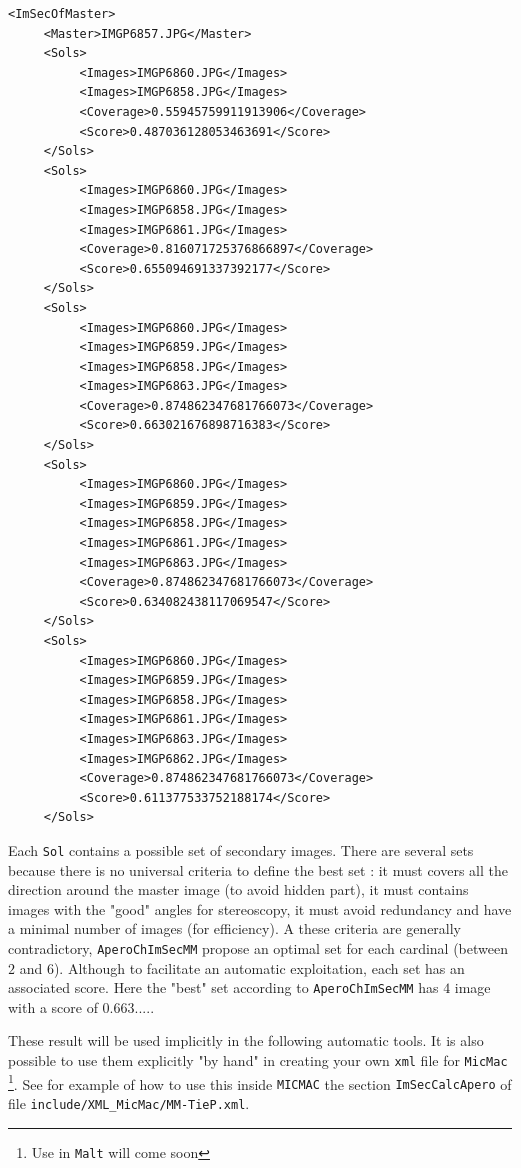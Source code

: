 {\small
\begin{verbatim}
<ImSecOfMaster>
     <Master>IMGP6857.JPG</Master>
     <Sols>
          <Images>IMGP6860.JPG</Images>
          <Images>IMGP6858.JPG</Images>
          <Coverage>0.55945759911913906</Coverage>
          <Score>0.487036128053463691</Score>
     </Sols>
     <Sols>
          <Images>IMGP6860.JPG</Images>
          <Images>IMGP6858.JPG</Images>
          <Images>IMGP6861.JPG</Images>
          <Coverage>0.816071725376866897</Coverage>
          <Score>0.655094691337392177</Score>
     </Sols>
     <Sols>
          <Images>IMGP6860.JPG</Images>
          <Images>IMGP6859.JPG</Images>
          <Images>IMGP6858.JPG</Images>
          <Images>IMGP6863.JPG</Images>
          <Coverage>0.874862347681766073</Coverage>
          <Score>0.663021676898716383</Score>
     </Sols>
     <Sols>
          <Images>IMGP6860.JPG</Images>
          <Images>IMGP6859.JPG</Images>
          <Images>IMGP6858.JPG</Images>
          <Images>IMGP6861.JPG</Images>
          <Images>IMGP6863.JPG</Images>
          <Coverage>0.874862347681766073</Coverage>
          <Score>0.634082438117069547</Score>
     </Sols>
     <Sols>
          <Images>IMGP6860.JPG</Images>
          <Images>IMGP6859.JPG</Images>
          <Images>IMGP6858.JPG</Images>
          <Images>IMGP6861.JPG</Images>
          <Images>IMGP6863.JPG</Images>
          <Images>IMGP6862.JPG</Images>
          <Coverage>0.874862347681766073</Coverage>
          <Score>0.611377533752188174</Score>
     </Sols>
\end{verbatim}
}

Each {\tt Sol} contains a possible set of secondary images. There are several sets because there is no universal
criteria to define the best set : it must covers  all the direction around the master image
(to avoid hidden part), it must contains images with the "good" angles for stereoscopy, it
must avoid redundancy and have a minimal number of images (for efficiency). A these criteria
are generally contradictory, {\tt AperoChImSecMM} propose an optimal set for each cardinal
(between $2$ and $6$). Although to facilitate an automatic exploitation, each set has an
associated score. Here the "best" set according to {\tt AperoChImSecMM} has $4$ image with
a score of $0.663....$.

These result will be used implicitly in the following automatic tools. It is also possible to use them explicitly
"by hand" in creating your own {\tt xml} file for {\tt MicMac} \footnote{Use in {\tt Malt} will come soon}. 
See for example of how to use this inside {\tt MICMAC} the section {\tt ImSecCalcApero} of file 
{\tt include/XML\_MicMac/MM-TieP.xml}.


